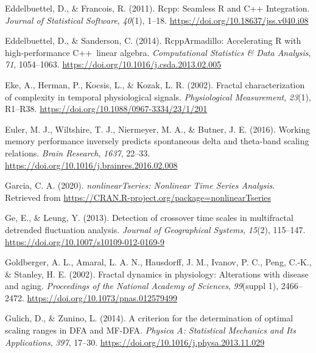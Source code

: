 \documentclass[
  man]{apa6}
\newlength{\cslhangindent}
\newlength{\cslentryspacingunit} %
\newenvironment{CSLReferences}[2] %
 {%
  \setlength{\parindent}{0pt}
  \ifodd #1
  \let\oldpar\par
  \def\par{\hangindent=\cslhangindent\oldpar}
  \fi
  \setlength{\parskip}{#2\cslentryspacingunit}
 }%
 {}
\begin{document}
\begin{CSLReferences}{1}{0}
\leavevmode{}%
Eddelbuettel, D., \& Francois, R. (2011). Rcpp: {Seamless} {R} and {C}++ {Integration}. \emph{Journal of Statistical Software}, \emph{40}(1), 1--18. \url{https://doi.org/10.18637/jss.v040.i08}

\leavevmode{}%
Eddelbuettel, D., \& Sanderson, C. (2014). {RcppArmadillo}: {Accelerating} {R} with high-performance {C}++~linear algebra. \emph{Computational Statistics \& Data Analysis}, \emph{71}, 1054--1063. \url{https://doi.org/10.1016/j.csda.2013.02.005}

\leavevmode{}%
Eke, A., Herman, P., Kocsis, L., \& Kozak, L. R. (2002). Fractal characterization of complexity in temporal physiological signals. \emph{Physiological Measurement}, \emph{23}(1), R1--R38. \url{https://doi.org/10.1088/0967-3334/23/1/201}

\leavevmode{}%
Euler, M. J., Wiltshire, T. J., Niermeyer, M. A., \& Butner, J. E. (2016). Working memory performance inversely predicts spontaneous delta and theta-band scaling relations. \emph{Brain Research}, \emph{1637}, 22--33. \url{https://doi.org/10.1016/j.brainres.2016.02.008}

\leavevmode{}%
Garcia, C. A. (2020). \emph{{nonlinearTseries}: {Nonlinear} {Time} {Series} {Analysis}}. Retrieved from \url{https://CRAN.R-project.org/package=nonlinearTseries}

\leavevmode{}%
Ge, E., \& Leung, Y. (2013). Detection of crossover time scales in multifractal detrended fluctuation analysis. \emph{Journal of Geographical Systems}, \emph{15}(2), 115--147. \url{https://doi.org/10.1007/s10109-012-0169-9}

\leavevmode{}%
Goldberger, A. L., Amaral, L. A. N., Hausdorff, J. M., Ivanov, P. C., Peng, C.-K., \& Stanley, H. E. (2002). Fractal dynamics in physiology: {Alterations} with disease and aging. \emph{Proceedings of the National Academy of Sciences}, \emph{99}(suppl 1), 2466--2472. \url{https://doi.org/10.1073/pnas.012579499}

\leavevmode{}%
Gulich, D., \& Zunino, L. (2014). A criterion for the determination of optimal scaling ranges in {DFA} and {MF}-{DFA}. \emph{Physica A: Statistical Mechanics and Its Applications}, \emph{397}, 17--30. \url{https://doi.org/10.1016/j.physa.2013.11.029}


\end{CSLReferences}
\end{document}
